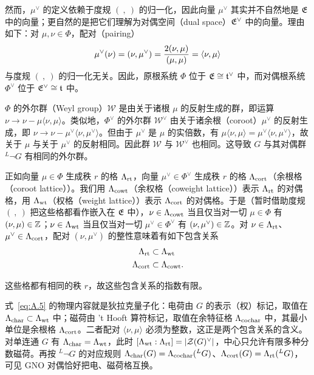 然而，$\mu^\vee$ 的定义依赖于度规 $(~,~)$ 的归一化，因此向量 $\mu^\vee$ 其实并不自然地是 $\mathfrak{E}$ 中的向量；更自然的是把它们理解为对偶空间（dual space）$\mathfrak{E}^\vee$ 中的向量。理由如下：对 $\mu,\nu\in \Phi$，配对（pairing）
\setcounter{equation}{3}
\begin{equation}\label{eq:A.4}
  \mu^\vee(\nu)=(\nu,\mu^\vee)={2(\nu,\mu)\over (\mu,\mu)}=
\langle \nu,\mu\rangle
\end{equation}
与度规 $(~,~)$ 的归一化无关。因此，原根系统 $\Phi$ 位于 $\mathfrak{E}\cong \mathfrak t^\vee$ 中，而对偶根系统 $\Phi^\vee$ 位于 $\mathfrak{E}^\vee\cong \mathfrak t$ 中。

$\Phi$ 的外尔群（Weyl group）$\mathcal W$ 是由关于诸根 $\mu$ 的反射生成的群，即运算 $\nu\to\nu-\mu\langle\nu,\mu\rangle$。类似地，$\Phi^\vee$ 的外尔群 $\mathcal W^\vee$ 由关于诸余根（coroot）$\mu^\vee$ 的反射生成，即 $\nu\to\nu-\mu^\vee\langle\nu,\mu^\vee\rangle$。但由于 $\mu^\vee$ 是 $\mu$ 的实倍数，有 $\mu\langle\nu,\mu\rangle=\mu^\vee\langle\nu,\mu^\vee\rangle$，故关于 $\mu$ 与关于 $\mu^\vee$ 的反射相同。因此群 $\mathcal W$ 与 $\mathcal W^\vee$ 也相同。这导致 $G$ 与其对偶群 $^L\neg G$ 有相同的外尔群。

正如向量 $\mu\in\Phi$ 生成秩 $r$ 的格 $\Lambda_{\rm rt}$，向量 $\mu^\vee\in\Phi^\vee$ 生成秩 $r$ 的格 $\Lambda_{\rm cort}$（余根格（coroot lattice））。我们用 $\Lambda_{\rm cowt}$（余权格（coweight lattice））表示 $\Lambda_{\rm rt}$ 的对偶格，用 $\Lambda_{\rm wt}$（权格（weight lattice））表示 $\Lambda_{\rm cort}$ 的对偶格。于是（暂时借助度规 $(~,~)$ 把这些格都看作嵌入在 $\mathfrak{E}$ 中），$\nu\in\Lambda_{\rm cowt}$ 当且仅当对一切 $\mu\in\Phi$ 有 $(\nu,\mu)\in{\mathbb{Z}}$；$\nu\in\Lambda_{\rm wt}$ 当且仅当对一切 $\mu^\vee\in\Phi^\vee$ 有 $(\nu,\mu^\vee)\in{\mathbb{Z}}$。对 $\nu\in \Lambda_{\rm rt}$、$\mu^\vee\in\Lambda_{\rm cort}$，配对 $(\nu,\mu^\vee)$ 的整性意味着有如下包含关系
\setcounter{equation}{4}
\begin{equation}\label{eq:A.5}
  \begin{aligned}\Lambda_{\rm rt} & \subset \Lambda_{\rm wt} \\
                    \Lambda_{\rm cort} & \subset\Lambda_{\rm cowt}.\end{aligned}
\end{equation}

这些格都有相同的秩 $r$，故这些包含关系的指数有限。

\begin{yizhu}[物理图像补充]
式~\eqref{eq:A.5} 的物理内容就是狄拉克量子化：电荷由 $G$ 的表示（权）标记，取值在 $\Lambda_{\rm char}\subset\Lambda_{\rm wt}$ 中；磁荷由 't Hooft 算符标记，取值在余特征格 $\Lambda_{\rm cochar}$ 中，其最小单位是余根格 $\Lambda_{\rm cort}$。二者配对 $\langle\nu,\mu\rangle$ 必须为整数，这正是两个包含关系的含义。对单连通 $G$ 有 $\Lambda_{\rm char}=\Lambda_{\rm wt}$，此时 $[\Lambda_{\rm wt}:\Lambda_{\rm rt}]=|{\mathcal Z}(G)^\vee|$，中心只允许有限多种分数磁荷。再按 $^L\neg G$ 的对应规则 $\Lambda_{\rm char}(G)=\Lambda_{\rm cochar}({}^LG)$、$\Lambda_{\rm cort}(G)=\Lambda_{\rm rt}({}^LG)$，可见 GNO 对偶恰好把电、磁荷格互换。
\end{yizhu}

